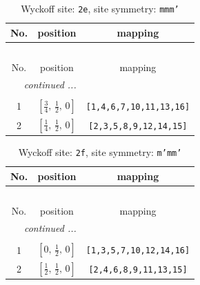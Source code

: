 \documentclass[fleqn,8pt]{jsarticle}
\begin{document}
\begin{longtable}{ccc}
\caption{Wyckoff site: {\tt 2e}, site symmetry: {\tt mmm'}}
 \\
 \hline \hline
No. & position & mapping \\ \hline \endfirsthead

\multicolumn{2}{l}{\tablename\ \thetable{}} \\
 \hline \hline
No. & position & mapping \\ \hline \endhead

 \hline \hline
\multicolumn{2}{r}{\footnotesize\it continued ...} \\ \endfoot

 \hline \hline
\multicolumn{2}{r}{} \\ \endlastfoot

1 & $\left[ \frac{3}{4},\, \frac{1}{2},\, 0 \right]$ & {\tt [1,4,6,7,10,11,13,16]} \\ \hline
2 & $\left[ \frac{1}{4},\, \frac{1}{2},\, 0 \right]$ & {\tt [2,3,5,8,9,12,14,15]} \\
\end{longtable}
\renewcommand{\arraystretch}{1.2}
\begin{longtable}{ccc}
\caption{Wyckoff site: {\tt 2f}, site symmetry: {\tt m'mm'}}
 \\
 \hline \hline
No. & position & mapping \\ \hline \endfirsthead

\multicolumn{2}{l}{\tablename\ \thetable{}} \\
 \hline \hline
No. & position & mapping \\ \hline \endhead

 \hline \hline
\multicolumn{2}{r}{\footnotesize\it continued ...} \\ \endfoot

 \hline \hline
\multicolumn{2}{r}{} \\ \endlastfoot

1 & $\left[ 0,\, \frac{1}{2},\, 0 \right]$ & {\tt [1,3,5,7,10,12,14,16]} \\ \hline
2 & $\left[ \frac{1}{2},\, \frac{1}{2},\, 0 \right]$ & {\tt [2,4,6,8,9,11,13,15]} \\
\end{longtable}
\renewcommand{\arraystretch}{1.2}
\end{document}
